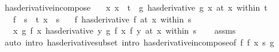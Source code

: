 \begin{isabellebody}
\endisatagproof
{\isafoldproof}%
%
\isadelimproof
\isanewline
%
\endisadelimproof
\isanewline
{}\isamarkupfalse%
\ has{\isacharunderscore}{\kern0pt}derivative{\isacharunderscore}{\kern0pt}in{\isacharunderscore}{\kern0pt}compose{}{\isacharcolon}{\kern0pt}\isanewline
\ \ \ {\isachardoublequoteopen}{\isasymAnd}x{\isachardot}{\kern0pt}\ x\ {\isasymin}\ t\ {\isasymLongrightarrow}\ {\isacharparenleft}{\kern0pt}g\ has{\isacharunderscore}{\kern0pt}derivative\ g{\isacharprime}{\kern0pt}\ x{\isacharparenright}{\kern0pt}\ {\isacharparenleft}{\kern0pt}at\ x\ within\ t{\isacharparenright}{\kern0pt}{\isachardoublequoteclose}\isanewline
\ \ \ {\isachardoublequoteopen}f\ {\isacharbackquote}{\kern0pt}\ s\ {\isasymsubseteq}\ t{\isachardoublequoteclose}\ {\isachardoublequoteopen}x\ {\isasymin}\ s{\isachardoublequoteclose}\isanewline
\ \ \ {\isachardoublequoteopen}{\isacharparenleft}{\kern0pt}f\ has{\isacharunderscore}{\kern0pt}derivative\ f{\isacharprime}{\kern0pt}{\isacharparenright}{\kern0pt}\ {\isacharparenleft}{\kern0pt}at\ x\ within\ s{\isacharparenright}{\kern0pt}{\isachardoublequoteclose}\isanewline
\ \ \ {\isachardoublequoteopen}{\isacharparenleft}{\kern0pt}{\isacharparenleft}{\kern0pt}{\isasymlambda}x{\isachardot}{\kern0pt}\ g\ {\isacharparenleft}{\kern0pt}f\ x{\isacharparenright}{\kern0pt}{\isacharparenright}{\kern0pt}\ has{\isacharunderscore}{\kern0pt}derivative\ {\isacharparenleft}{\kern0pt}{\isasymlambda}y{\isachardot}{\kern0pt}\ g{\isacharprime}{\kern0pt}\ {\isacharparenleft}{\kern0pt}f\ x{\isacharparenright}{\kern0pt}\ {\isacharparenleft}{\kern0pt}f{\isacharprime}{\kern0pt}\ y{\isacharparenright}{\kern0pt}{\isacharparenright}{\kern0pt}{\isacharparenright}{\kern0pt}\ {\isacharparenleft}{\kern0pt}at\ x\ within\ s{\isacharparenright}{\kern0pt}{\isachardoublequoteclose}\isanewline
%
\isadelimproof
\ \ %
\endisadelimproof
%
\isatagproof
{}\isamarkupfalse%
\ assms\isanewline
\ \ \isamarkupfalse%
\ {\isacharparenleft}{\kern0pt}auto\ intro{\isacharcolon}{\kern0pt}\ has{\isacharunderscore}{\kern0pt}derivative{\isacharunderscore}{\kern0pt}subset\ intro{\isacharbang}{\kern0pt}{\isacharcolon}{\kern0pt}\ has{\isacharunderscore}{\kern0pt}derivative{\isacharunderscore}{\kern0pt}in{\isacharunderscore}{\kern0pt}compose{\isacharbrackleft}{\kern0pt}of\ f\ f{\isacharprime}{\kern0pt}\ x\ s\ g{\isacharbrackright}{\kern0pt}{\isacharparenright}{\kern0pt}%
\endisatagproof
{\isafoldproof}%
%
\isadelimproof
\isanewline
%
\endisadelimproof
\isanewline

\end{isabellebody}
